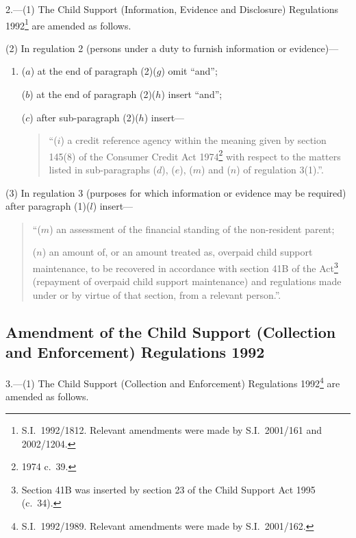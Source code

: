 \documentclass[12pt,a4paper]{article}
\begin{document}
2.---(1)  The Child Support (Information, Evidence and Disclosure) Regulations 1992\footnote{S.I.\ 1992/1812. Relevant amendments were made by S.I.\ 2001/161 and 2002/1204.} are amended as follows.

(2) In regulation 2 (persons under a duty to furnish information or evidence)—
\begin{enumerate}\item[]
($a$) at the end of paragraph (2)($g$)  omit “and”;

($b$) at the end of paragraph (2)($h$)  insert “and”;

($c$) after sub-paragraph (2)($h$)  insert—
\begin{quotation}
“($i$) a credit reference agency within the meaning given by section 145(8) of the Consumer Credit Act 1974\footnote{1974 c.\ 39.} with respect to the matters listed in sub-paragraphs ($d$), ($e$), ($m$)  and ($n$)  of regulation 3(1).”.
\end{quotation}
\end{enumerate}

(3) In regulation 3 (purposes for which information or evidence may be required) after paragraph (1)($l$)  insert—
\begin{quotation}
“($m$)  an assessment of the financial standing of the non-resident parent;

($n$) an amount of, or an amount treated as, overpaid child support maintenance, to be recovered in accordance with section 41B of the Act\footnote{Section 41B was inserted by section 23 of the Child Support Act 1995 (c.\ 34).} (repayment of overpaid child support maintenance) and regulations made under or by virtue of that section, from a relevant person.”.
\end{quotation}

\subsection[3. Amendment of the Child Support (Collection and Enforcement) Regulations 1992]{Amendment of the Child Support (Collection and Enforcement) Regulations 1992}

3.---(1)  The Child Support (Collection and Enforcement) Regulations 1992\footnote{S.I.\ 1992/1989. Relevant amendments were made by S.I.\ 2001/162.} are amended as follows.
\end{document}
